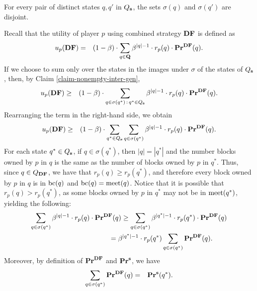 \begin{myclaim}
\label{claim-nonempty-inter-gen}
For every pair of distinct states $q,q'$ in $Q_{\mathbf{s}}$, the sets $\sigma(q)$ and $\sigma(q')$ are disjoint. 
\end{myclaim}

Recall that the utility of player $p$ using combined strategy $\text{\rm {\bf DF}}$ 
is defined as
\begin{eqnarray*}
u_p(\text{\rm {\bf DF}}) & = & (1-\beta) \cdot \sum_{q \in \mathbf{Q}} \beta^{|q|-1} \cdot r_p(q) \cdot \mathbf{Pr}^{\text{\rm {\bf DF}}}(q).
\end{eqnarray*}
If we choose to sum only over the states in the images under $\sigma$ of the states of $Q_{\mathbf{s}}$, then, by Claim \ref{claim-nonempty-inter-gen},
\begin{eqnarray*}
u_p(\text{\rm {\bf DF}}) & \geq & (1-\beta) \cdot \sum_{q \in \sigma(q^*) \,:\, q^* \in Q_{\mathbf{s}}} \beta^{|q|-1} \cdot r_p(q) \cdot \mathbf{Pr}^{\text{\rm {\bf DF}}}(q).
\end{eqnarray*}
Rearranging the term in the right-hand side, we obtain
\begin{eqnarray*}
u_p(\text{\rm {\bf DF}}) & \geq &(1-\beta) \cdot \sum_{q^* \in Q_{\mathbf{s}}} \sum_{q \in \sigma(q^*)} \beta^{|q|-1} \cdot r_p(q) \cdot \mathbf{Pr}^{\text{\rm {\bf DF}}}(q).
\end{eqnarray*}
For each state $q^* \in Q_{\mathbf{s}}$, if $q \in \sigma(q^*)$, then $|q| = |q^*|$ and the number blocks owned by $p$ in $q$ is the same as the number of blocks owned by $p$ in $q^*$. Thus, since $q \in Q_{\text{\rm {\bf DF}}}$, we have that $r_p(q) \geq r_p(q^*)$, and therefore every block owned by $p$ in $q$ is in $\text{bc}(q)$ and $\text{bc}(q) = \text{\rm meet}(q)$. Notice that it is possible that $r_p(q) > r_p(q^*)$, as some blocks owned by $p$ in $q^*$ may not be in $\text{\rm meet}(q^*)$, yielding the following:
\begin{align*}
&\hspace{-2pt} \sum_{q \in \sigma(q^*)} \beta^{|q|-1} \cdot r_p(q) \cdot \pr^{\cdf}(q) \geq \sum_{q \in \sigma(q^*)} \beta^{|q^*|-1} \cdot r_p(q^*) \cdot \pr^{\cdf}(q)\\
&\hspace{112pt} = \beta^{|q^*|-1} \cdot r_p(q^*) \sum_{q \in \sigma(q^*)} \pr^{\cdf}(q).
\end{align*}
Moreover, by definition of $\mathbf{Pr}^{\text{\rm {\bf DF}}}$ and $\mathbf{Pr}^{\mathbf{s}}$, we have
\begin{eqnarray*}
\sum_{q \in \sigma(q^*)} \mathbf{Pr}^{\text{\rm {\bf DF}}}(q) & = & \mathbf{Pr}^{\mathbf{s}}(q^*).
\end{eqnarray*}
